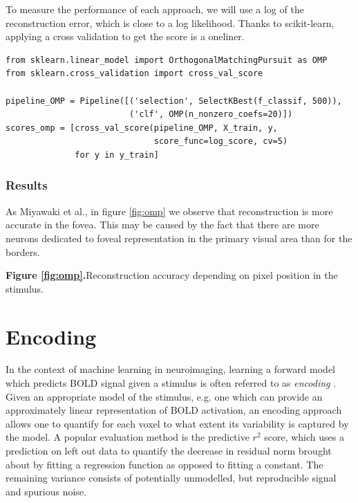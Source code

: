 \documentclass{frontiersSCNS} %
\begin{document}
To measure the performance of each approach, we will use a log of the
reconstruction error, which is close to a log likelihood. Thanks to
scikit-learn, applying a cross validation to get the score is a oneliner.

\begin{lstlisting}
from sklearn.linear_model import OrthogonalMatchingPursuit as OMP
from sklearn.cross_validation import cross_val_score

pipeline_OMP = Pipeline([('selection', SelectKBest(f_classif, 500)),
                         ('clf', OMP(n_nonzero_coefs=20)])
scores_omp = [cross_val_score(pipeline_OMP, X_train, y,
                              score_func=log_score, cv=5)
              for y in y_train]
\end{lstlisting}

\subsubsection{Results}

As Miyawaki et al., in figure \ref{fig:omp} we observe that reconstruction
is more accurate in the fovea. This
may be caused by the fact that there are more neurons dedicated to foveal
representation in the primary visual area than for the borders.

\textbf{Figure \ref{fig:omp}.}{Reconstruction accuracy depending on pixel
position in the stimulus.}\label{fig:02}

\section{Encoding}
In the context of machine learning in neuroimaging, learning a forward model which predicts BOLD signal given a stimulus is often referred to as \textit{encoding} \cite{Naselaris2011}.
Given an appropriate model of the stimulus, e.g. one which can provide an approximately linear representation of BOLD activation, an encoding approach allows one to quantify for each voxel to what extent its variability is captured by the model. A popular evaluation method is the predictive \(r^2\) score, which uses a prediction on left out data to quantify the decrease in residual norm brought about by fitting a regression function as opposed to fitting a constant. %
The remaining variance consists of potentially unmodelled, but reproducible signal and spurious noise.
\end{document}
